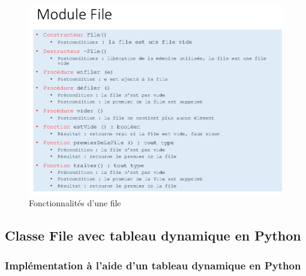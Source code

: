 \documentclass[11pt]{article}
\makeatletter
\def\maxwidth{\ifdim\Gin@nat@width>\linewidth\linewidth
    \else\Gin@nat@width\fi}
\let\Oldincludegraphics\includegraphics
\renewcommand{\includegraphics}[1]{\Oldincludegraphics[width=.8\maxwidth]{#1}}
\makeatother
\begin{document}
\begin{figure}
\centering
\includegraphics{fonctionnalite_file.png}
\caption{Fonctionnalités d'une file}
\end{figure}

    \hypertarget{classe-file-avec-tableau-dynamique-en-python}{%
\subsection{Classe File avec tableau dynamique en
Python}\label{classe-file-avec-tableau-dynamique-en-python}}

    \hypertarget{impluxe9mentation-uxe0-laide-dun-tableau-dynamique-en-python}{%
\subsubsection{Implémentation à l'aide d'un tableau dynamique en
Python}\label{impluxe9mentation-uxe0-laide-dun-tableau-dynamique-en-python}}
\end{document}
